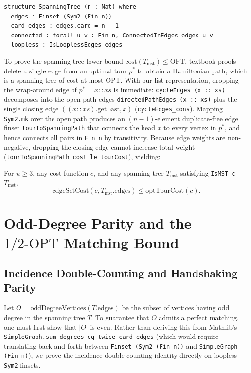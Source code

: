 \noindent\begin{minipage}{\linewidth}
\begin{lstlisting}[language=lean4]
structure SpanningTree (n : Nat) where
  edges : Finset (Sym2 (Fin n))
  card_edges : edges.card = n - 1
  connected : forall u v : Fin n, ConnectedInEdges edges u v
  loopless : IsLooplessEdges edges
\end{lstlisting}
\end{minipage}

To prove the spanning-tree lower bound $\mathrm{cost}(T_{\mathrm{mst}}) \le \mathrm{OPT}$, textbook proofs delete a single edge from an optimal tour $p^*$ to obtain a Hamiltonian path, which is a spanning tree of cost at most $\mathrm{OPT}$. With our list representation, dropping the wrap-around edge of $p^* = x :: xs$ is immediate: \texttt{cycleEdges (x :: xs)} decomposes into the open path edges \texttt{directedPathEdges (x :: xs)} plus the single closing edge $((x :: xs).\mathrm{getLast}, x)$ (\texttt{cycleEdges\_cons}). Mapping \texttt{Sym2.mk} over the open path produces an $(n-1)$-element duplicate-free edge finset \texttt{tourToSpanningPath} that connects the head $x$ to every vertex in $p^*$, and hence connects all pairs in \texttt{Fin n} by transitivity. Because edge weights are non-negative, dropping the closing edge cannot increase total weight (\texttt{tourToSpanningPath\_cost\_le\_tourCost}), yielding:
\begin{theorem}
For $n \ge 3$, any cost function $c$, and any spanning tree $T_{\mathrm{mst}}$ satisfying \texttt{IsMST c $T_{\mathrm{mst}}$},
\[
  \mathrm{edgeSetCost}(c, T_{\mathrm{mst}}.\mathrm{edges}) \le \mathrm{optTourCost}(c).
\]
\end{theorem}

\section{Odd-Degree Parity and the \texorpdfstring{$1/2\text{-}\mathrm{OPT}$}{1/2-OPT} Matching Bound}
\label{sec:matching}

\subsection{Incidence Double-Counting and Handshaking Parity}

Let $O = \mathrm{oddDegreeVertices}(T.\mathrm{edges})$ be the subset of vertices having odd degree in the spanning tree $T$. To guarantee that $O$ admits a perfect matching, one must first show that $|O|$ is even. Rather than deriving this from Mathlib's \texttt{SimpleGraph.\allowbreak sum\_degrees\_eq\_twice\_card\_edges} (which would require translating back and forth between \texttt{Finset (Sym2 (Fin n))} and \texttt{SimpleGraph (Fin n)}), we prove the incidence double-counting identity directly on loopless \texttt{Sym2} finsets.

